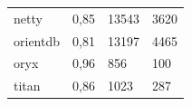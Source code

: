 \begin{table}[H]
\begin{center}
\begin{tabular}{llll}
netty                                & 0,85                           & 13543                                & 3620                             \\
orientdb                             & 0,81                           & 13197                                & 4465                             \\
oryx                                 & 0,96                           & 856                                  & 100                              \\
titan                                & 0,86                           & 1023                                 & 287                             
\end{tabular}
\end{center}
\end{table}